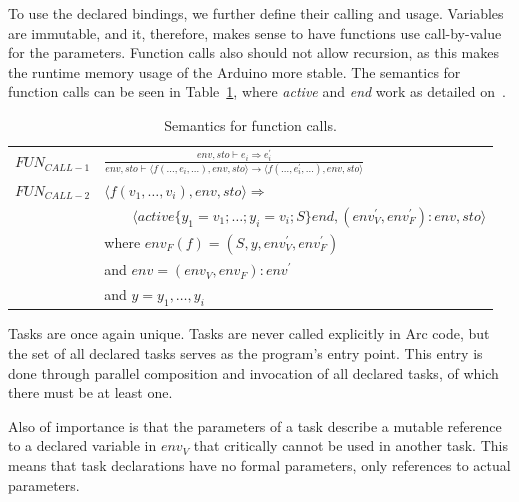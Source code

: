 To use the declared bindings, we further define their calling and usage. Variables are immutable, and it, therefore, makes sense to have functions use call-by-value for the parameters. Function calls also should not allow recursion, as this makes the runtime memory usage of the Arduino more stable. The semantics for function calls can be seen in Table~\ref{tab:functioncalls}, where \textit{active} and \textit{end} work as detailed on~\cite[p.~159]{Huttel2010}.


\begin{table}[htb!]
    \centering
    \begin{tabular}{ll}
        \toprule
        $FUN_{CALL-1}$ & $\frac
            {env, sto \vdash e_i \Rightarrow e^\prime_i}
            {env, sto \vdash \langle f(\dots, e_i, \dots), env,sto \rangle \rightarrow \langle f(\dots, e^\prime_i, \dots), env, sto \rangle}$ \\ [12pt]
        $FUN_{CALL-2}$ & $\langle f(v_1,\dots,v_i), env, sto \rangle \Rightarrow$                                                              \\
                       & $\qquad \langle active \{y_1 = v_1;\dots;y_i = v_i; S\} end, (env^\prime_V, env^\prime_F):env, sto \rangle$           \\ [12pt]

                       & where $env_F(f) = (S, y, env^\prime_V, env^\prime_F)$                                                                 \\
                       & and $env = (env_V, env_F) : env^\prime $                                                                              \\
                       & and $y = y_1,\dots,y_i$                                                                                               \\
        \bottomrule
    \end{tabular}
    \caption{Semantics for function calls.}
    \label{tab:functioncalls}
\end{table}


Tasks are once again unique. Tasks are never called explicitly in Arc code, but the set of all declared tasks serves as the program's entry point. This entry is done through parallel composition and invocation of all declared tasks, of which there must be at least one.

Also of importance is that the parameters of a task describe a mutable reference to a declared variable in $env_V$ that critically cannot be used in another task. This means that task declarations have no formal parameters, only references to actual parameters.


